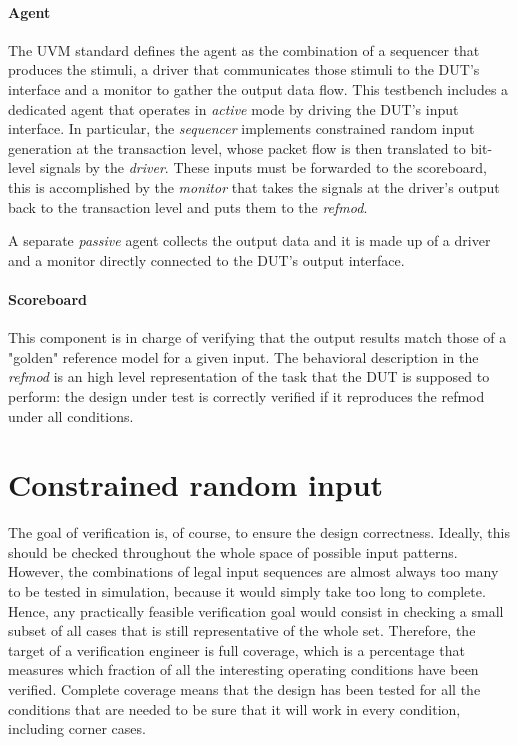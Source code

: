 \paragraph{Agent} The UVM standard defines the agent as the combination of a sequencer that produces the stimuli, a driver that communicates those stimuli to the DUT's interface and a monitor
to gather the output data flow. This testbench includes a dedicated agent that operates in \textit{active} mode by driving the DUT's input interface. In particular, the \textit{sequencer} implements constrained random input generation at the transaction level, whose packet flow is then translated to bit-level signals by the \textit{driver}. These inputs must be forwarded to the scoreboard, this is accomplished by the \textit{monitor} that takes the signals at the driver's output back to the transaction level and puts them to the \textit{refmod}.

A separate \textit{passive} agent collects the output data and it is made up of a driver and a monitor directly connected to the DUT's output interface.

\paragraph{Scoreboard} This component is in charge of verifying that the output results match those of a "golden" reference model for a given input. The behavioral description in the \textit{refmod} is an high level representation of the task that the DUT is supposed to perform: the design under test is correctly verified if it reproduces the refmod under all conditions.


\section{Constrained random input}
The goal of verification is, of course, to ensure the design correctness. Ideally, this should be checked throughout the whole space of possible input patterns. However, the combinations of legal input sequences are almost always too many to be tested in simulation, because it would simply take too long to complete. Hence, any practically feasible verification goal would consist in checking a small subset of all cases that is still representative of the whole set. Therefore, the target of a verification engineer is full coverage, which is a percentage that measures which fraction of all the interesting operating conditions have been verified. Complete coverage means that the design has been tested for all the conditions that are needed to be sure that it will work in every condition, including corner cases.

